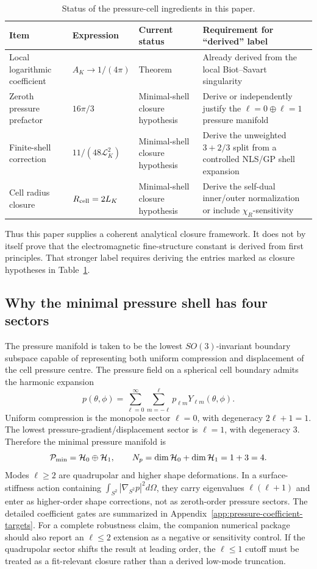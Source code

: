 \documentclass[11pt]{article}
\begin{document}
\begin{table}[h]
\centering
\caption{Status of the pressure-cell ingredients in this paper.}
\begin{tabular}{@{}llll@{}}
\toprule
Item & Expression & Current status & Requirement for ``derived'' label\\
\midrule
Local logarithmic coefficient &
\(A_K\to1/(4\pi)\) &
Theorem &
Already derived from the local Biot--Savart singularity\\
Zeroth pressure prefactor &
\(16\pi/3\) &
Minimal-shell closure hypothesis &
Derive or independently justify the \(\ell=0\oplus\ell=1\) pressure manifold\\
Finite-shell correction &
\(11/(48\mathcal L_K^2)\) &
Minimal-shell closure hypothesis &
Derive the unweighted \(3+2/3\) split from a controlled NLS/GP shell expansion\\
Cell radius closure &
\(R_{\rm cell}=2L_K\) &
Minimal-shell closure hypothesis &
Derive the self-dual inner/outer normalization or include \(\chi_R\)-sensitivity\\
\bottomrule
\end{tabular}
\label{tab:derived-label-ledger}
\end{table}

Thus this paper supplies a coherent analytical closure framework.  It does not
by itself prove that the electromagnetic fine-structure constant is derived
from first principles.  That stronger label requires deriving the entries
marked as closure hypotheses in Table~\ref{tab:derived-label-ledger}.


\subsection{Why the minimal pressure shell has four sectors}
\label{subsec:why-four-pressure-sectors}

The pressure manifold is taken to be the lowest \(SO(3)\)-invariant boundary
subspace capable of representing both uniform compression and displacement of
the cell pressure centre.  The pressure field on a spherical cell boundary
admits the harmonic expansion
\[
  p(\theta,\phi)
  =
  \sum_{\ell=0}^{\infty}\sum_{m=-\ell}^{\ell}
  p_{\ell m}Y_{\ell m}(\theta,\phi).
\]
Uniform compression is the monopole sector \(\ell=0\), with degeneracy
\(2\ell+1=1\).  The lowest pressure-gradient/displacement sector is
\(\ell=1\), with degeneracy \(3\).  Therefore the minimal pressure manifold is
\[
  \mathcal P_{\rm min}
  =
  \mathcal H_0\oplus\mathcal H_1,
  \qquad
  N_p=\dim\mathcal H_0+\dim\mathcal H_1=1+3=4.
\]
Modes \(\ell\ge2\) are quadrupolar and higher shape deformations.  In a
surface-stiffness action containing \(\int_{S^2}|\nabla_{S^2}p|^2d\Omega\),
they carry eigenvalues \(\ell(\ell+1)\) and enter as higher-order shape
corrections, not as zeroth-order pressure sectors.  The detailed coefficient
gates are summarized in Appendix~\ref{app:pressure-coefficient-targets}.
For a complete robustness claim, the companion numerical package should also
report an \(\ell\le2\) extension as a negative or sensitivity control.  If the
quadrupolar sector shifts the result at leading order, the \(\ell\le1\) cutoff
must be treated as a fit-relevant closure rather than a derived low-mode
truncation.
\end{document}
